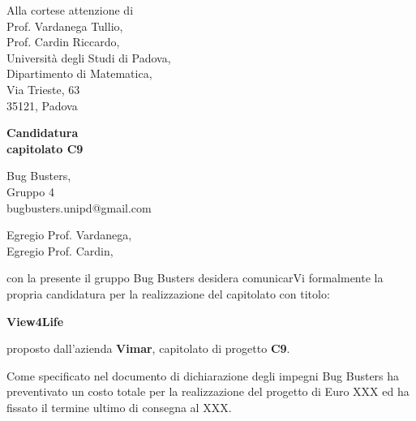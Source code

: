 \documentclass[a4paper,11pt]{letter}
\begin{document}
\begin{letter}{
    Alla cortese attenzione di \\
    Prof. Vardanega Tullio, \\
    Prof. Cardin Riccardo, \\
    Università degli Studi di Padova, \\
    Dipartimento di Matematica, \\
    Via Trieste, 63 \\
    35121, Padova
}

\noindent
\begin{minipage}[t]{0.65\textwidth}
    {\Huge\bfseries Candidatura} \\[0.3cm]
    {\Huge\bfseries capitolato C9}
\end{minipage}%
\hfill
\begin{minipage}[t]{0.3\textwidth}
    \raggedleft
    {\small Bug Busters,} \\
    {\small Gruppo 4} \\
    {\small bugbusters.unipd@gmail.com} \\[0.3cm]
\end{minipage}

\vspace{2em}

\opening{Egregio Prof. Vardanega, \\ Egregio Prof. Cardin,}

con la presente il gruppo Bug Busters desidera comunicarVi formalmente la propria candidatura per la realizzazione del capitolato con titolo:

\begin{center}
    \textbf{View4Life}
\end{center}

proposto dall'azienda \textbf{Vimar}, capitolato di progetto \textbf{C9}.

\vspace{1em}

Come specificato nel documento di dichiarazione degli impegni Bug Busters ha preventivato un costo totale per la realizzazione del progetto di Euro XXX ed ha fissato il termine ultimo di consegna al XXX.


\end{letter}
\end{document}
